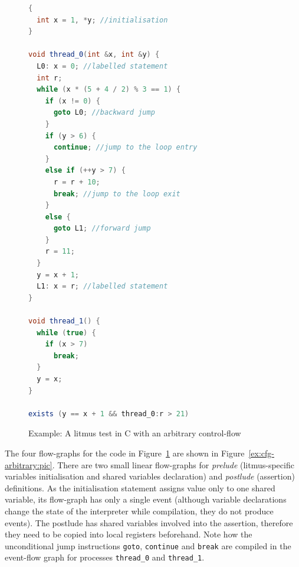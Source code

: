 \begin{figure}%
\centering
\begin{minipage}[t]{.5\textwidth}%
\begin{lstlisting}[language=Java]
{
  int x = 1, *y; //initialisation
}

void thread_0(int &x, int &y) {
  L0: x = 0; //labelled statement
  int r;
  while (x * (5 + 4 / 2) % 3 == 1) {
    if (x != 0) {
      goto L0; //backward jump
    }
    if (y > 6) {
      continue; //jump to the loop entry
    }
    else if (++y > 7) {
      r = r + 10;
      break; //jump to the loop exit
    }
    else {
      goto L1; //forward jump
    }
    r = 11;
  }
  y = x + 1;
  L1: x = r; //labelled statement
}

void thread_1() {
  while (true) {
    if (x > 7)
      break;
  }
  y = x;
}

exists (y == x + 1 && thread_0:r > 21)

\end{lstlisting}
\end{minipage}
\caption{Example: A litmus test in C with an arbitrary control-flow}
\label{ex:cfg-arbitrary}
\end{figure}

The four flow-graphs for the code in Figure~\ref{ex:cfg-arbitrary} are shown in Figure~\ref{ex:cfg-arbitrary:pic}.
There are two small linear flow-graphs for \textit{prelude} (litmus-specific variables initialisation and shared variables declaration) and \textit{postlude} (assertion) definitions.
As the initialisation statement assigns value only to one shared variable, its flow-graph has only a single event (although variable declarations change the state of the interpreter while compilation, they do not produce events).
The postlude has shared variables involved into the assertion, therefore they need to be copied into local registers beforehand.
Note how the unconditional jump instructions \texttt{goto}, \texttt{continue} and \texttt{break} are compiled in the event-flow graph for processes \texttt{thread\_0} and \texttt{thread\_1}.

